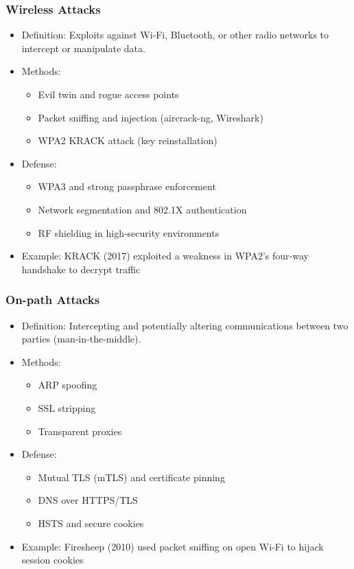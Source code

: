 \documentclass[11pt]{article}
\begin{document}
\subsubsection{Wireless Attacks}
\label{sec:org75c73ec}
\begin{itemize}
\item Definition: Exploits against Wi‑Fi, Bluetooth, or other radio networks to intercept or manipulate data.
\item Methods:
\begin{itemize}
\item Evil twin and rogue access points
\item Packet sniffing and injection (aircrack-ng, Wireshark)
\item WPA2 KRACK attack (key reinstallation)
\end{itemize}
\item Defense:
\begin{itemize}
\item WPA3 and strong passphrase enforcement
\item Network segmentation and 802.1X authentication
\item RF shielding in high‑security environments
\end{itemize}
\item Example: KRACK (2017) exploited a weakness in WPA2’s four‑way handshake to decrypt traffic
\end{itemize}
\subsubsection{On-path Attacks}
\label{sec:org0b61bc9}
\begin{itemize}
\item Definition: Intercepting and potentially altering communications between two parties (man‑in‑the‑middle).
\item Methods:
\begin{itemize}
\item ARP spoofing
\item SSL stripping
\item Transparent proxies
\end{itemize}
\item Defense:
\begin{itemize}
\item Mutual TLS (mTLS) and certificate pinning
\item DNS over HTTPS/TLS
\item HSTS and secure cookies
\end{itemize}
\item Example: Firesheep (2010) used packet sniffing on open Wi‑Fi to hijack session cookies
\end{itemize}
\end{document}
